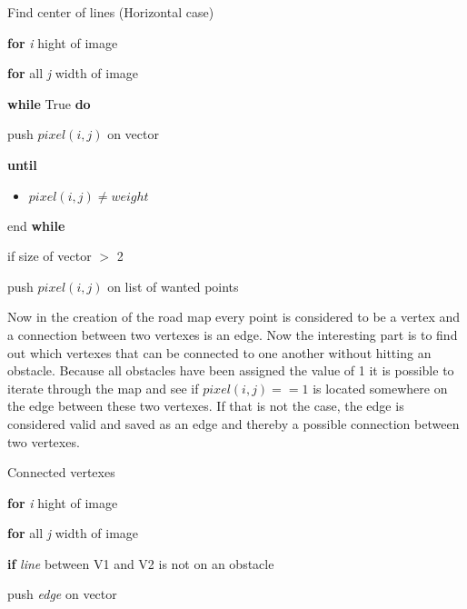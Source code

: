 \documentclass[../Head/Main.tex]{subfiles}
\begin{document}
\begin{Pseudo}{Find center of lines (Horizontal case)}{}

 	\textbf{for} \textit{i} hight of image 
	\begin{Indentation}
		\item 
	\begin{Indentation}
	\item \textbf{for} all \textit{j} width of image 
	\item \textbf{while} True \textbf{do}
	\item push $pixel(i,j)$ on vector
	
	\item \textbf{until}
				
	\begin{itemize}
	\item $pixel(i,j) \neq weight$  
	\end{itemize}
	
	\item end \textbf{while} 
	
	\item if size of vector $>$ 2
	\item push $pixel(i,j)$ on list of wanted points
	\end{Indentation}
	
	\end{Indentation}

	
\end{Pseudo} 

Now in the creation of the road map every point is considered to be a vertex and a connection between two vertexes is an edge. Now the interesting part is to find out which vertexes that can be connected to one another without hitting an obstacle. Because all obstacles have been assigned the value of 1 it is possible to iterate through the map and see if $pixel(i,j) == 1$ is located somewhere on the edge between these two vertexes. If that is not the case, the edge is considered valid and saved as an edge and thereby a possible connection between two vertexes.  

\begin{Pseudo}{Connected vertexes}{}

 	\textbf{for} \textit{i} hight of image 
	\begin{Indentation}
		\item 
	\begin{Indentation}
	\item \textbf{for} all \textit{j} width of image 
	\item \textbf{if} \textit{line} between V1 and V2 is not on an obstacle   	
	\item push \textit{edge} on vector

	\end{Indentation}
	
	\end{Indentation}

	
\end{Pseudo} 
\end{document}
